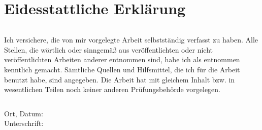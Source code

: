 \thispagestyle{empty}

\begin{verbatim}

\end{verbatim}

\chapter*{Eidesstattliche Erklärung}

\begin{verbatim}

\end{verbatim}

Ich versichere, die von mir vorgelegte Arbeit selbstständig verfasst zu haben. Alle Stellen, die wörtlich oder sinngemäß aus veröffentlichten oder nicht veröffentlichten Arbeiten anderer entnommen sind, habe ich als entnommen kenntlich gemacht. Sämtliche Quellen und Hilfsmittel, die ich für die Arbeit benutzt habe, sind angegeben. Die Arbeit hat mit gleichem Inhalt bzw. in wesentlichen Teilen noch keiner anderen Prüfungsbehörde vorgelegen.

\begin{verbatim}

\end{verbatim}

Ort, Datum:~~~~~~~~~~~~~~~~~~~~~~~~~~~~~~~~~~~~~~~~~~
Unterschrift:~~~~~~~~~~~~~~~~~~~~~~~~~~~~~~~~~~~~~~~~~~
